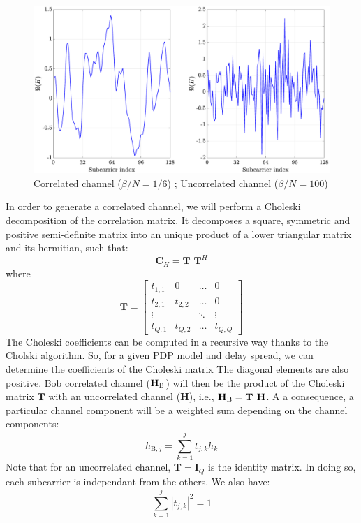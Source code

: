 \documentclass[12pt]{article}
\begin{document}
\begin{figure}[h!]
\centering
\includegraphics[width=.65\linewidth]{img/channelComparaison.eps}
\caption{Correlated channel ($\beta/N = 1/6$) ; Uncorrelated channel ($\beta/N = 100$)}
\label{fig:channel}
\end{figure} 
In order to generate a correlated channel, we will perform a Choleski decomposition of the correlation matrix. It decomposes a square, symmetric and positive semi-definite matrix into an unique product of a lower triangular matrix and its hermitian, such that:
\begin{equation}
	\textbf{C}_H = \textbf{T T}^H
\end{equation}
where
\begin{equation}
	\textbf{T} = 
	\begin{bmatrix}
	t_{1,1} & 0 & \hdots & 0 \\
	t_{2,1} & t_{2,2} & \hdots & 0 \\
	\vdots & & \ddots & \vdots \\
	t_{Q,1} & t_{Q,2} & \hdots & t_{Q,Q}
	\end{bmatrix}
\end{equation}
The Choleski coefficients can be computed in a recursive way thanks to the Cholski algorithm. So, for a given PDP model and delay spread, we can determine the coefficients of the Choleski matrix The diagonal elements are also positive. Bob correlated channel ($\textbf{H}_{\text{B}}$) will then be the product of the Choleski matrix $\textbf{T}$ with an uncorrelated channel ($\textbf{H}$), i.e., $\textbf{H}_{\text{B}} = \textbf{T H}$. A a consequence, a particular channel component will be a weighted sum depending on the channel components:
\begin{equation}
 	h_{\text{B},j} = \sum_{k = 1}^{j} t_{j,k} h_k
 	\label{eq:corr_channel}
\end{equation}
Note that for an uncorrelated channel, $\textbf{T} = \textbf{I}_Q$ is the identity matrix. In doing so, each subcarrier is independant from the others. We also have:
\begin{equation}
	\sum_{k = 1}^{j} \left| t_{j,k}\right|^2 = 1
	\label{eq:chol_properties}
\end{equation}
\end{document}

